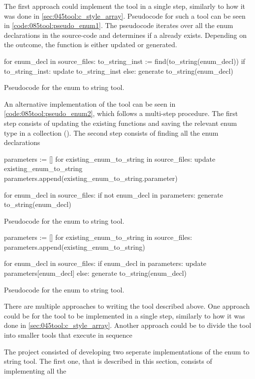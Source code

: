 The first approach could implement the tool in a single step, similarly to how it was done in \cref{sec:045tool:c_style_array}. Pseudocode for such a tool can be seen in \cref{code:085tool:pseudo_enum1}. The pseudocode iterates over all the enum declarations in the source-code and determines if a  already exists. Depending on the outcome, the function is either updated or generated.

\begin{listing}[H]
    \begin{pythoncode}
for enum_decl in source_files:
    to_string_inst := find(to_string(enum_decl))
    if to_string_inst:
        update to_string_inst
    else:
        generate to_string(enum_decl)
    \end{pythoncode}
    \caption{Pseudocode for the enum to string tool.}
    \label{code:085tool:pseudo_enum1}
\end{listing}

An alternative implementation of the tool can be seen in \cref{code:085tool:pseudo_enum2}, which follows a multi-step procedure. The first step consists of updating the existing  functions and saving the relevant enum type in a collection (). The second step consists of finding all the enum declarations %


\begin{listing}[H]
    \begin{pythoncode}
parameters := []
for existing_enum_to_string in source_files:
    update existing_enum_to_string
    parameters.append(existing_enum_to_string.parameter)

for enum_decl in source_files:
    if not enum_decl in parameters:
        generate to_string(enum_decl)
    \end{pythoncode}
    \caption{Pseudocode for the enum to string tool.}
    \label{code:085tool:pseudo_enum2}
\end{listing}

\begin{listing}[H]
    \begin{pythoncode}
parameters := []
for existing_enum_to_string in source_files:
    parameters.append(existing_enum_to_string)

for enum_decl in source_files:
    if enum_decl in parameters:
        update parameters[enum_decl]
    else:
        generate to_string(enum_decl)
    \end{pythoncode}
    \caption{Pseudocode for the enum to string tool.}
    \label{code:085tool:pseudo_enum3}
\end{listing}


There are multiple approaches to writing the tool described above. One approach could be for the tool to be implemented in a single step, similarly to how it was done in \cref{sec:045tool:c_style_array}. Another approach could be to divide the tool into smaller tools that execute in sequence

The project consisted of developing two seperate implementations of the enum to string tool. The first one, that is described in this section, consists of implementing all the

